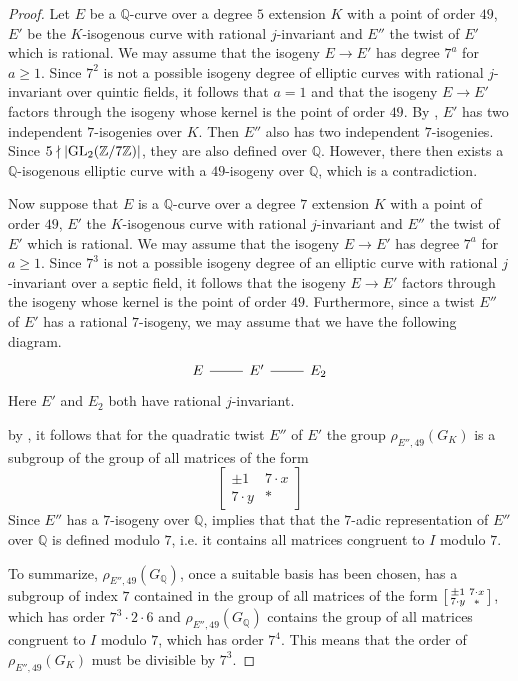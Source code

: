 \documentclass[10pt,leqno]{amsart}
\newcommand\m[1]{\begin{bmatrix}#1\end{bmatrix}}
\newcommand\sm[1]{\begin{bsmallmatrix}#1\end{bsmallmatrix}}
\newcommand{\Z}{\mathbb{Z}}
\newcommand{\Q}{\mathbb{Q}}
\newcommand{\GL}{\textnormal{GL}}
\theoremstyle{definition}
\theoremstyle{remark}
\numberwithin{theorem}{section}
\begin{document}
\begin{proof}
    Let $E$ be a $\Q$-curve over a degree $5$ extension $K$ with a point of order $49$, $E'$ be the $K$-isogenous curve with rational $j$-invariant and $E''$ the twist of $E'$ which is rational. We may assume that the isogeny $E \to E'$ has degree $7^a$ for $a\geq 1$. Since $7^2$ is not a possible isogeny degree of elliptic curves with rational $j$-invariant over quintic fields, it follows that $a=1$ and that the isogeny $E \to E'$ factors through the isogeny whose kernel is the point of order $49$.  By , $E'$ has two independent $7$-isogenies over $K$. Then $E''$ also has two independent $7$-isogenies. Since $5 \nmid |\GL_2(\Z/7\Z)|$, they are also defined over $\Q$. However, there then exists a $\Q$-isogenous elliptic curve with a $49$-isogeny over $\Q$, which is a contradiction. 

    Now suppose that $E$ is a $\Q$-curve over a degree $7$ extension $K$ with a point of order $49$, $E'$ the $K$-isogenous curve with rational $j$-invariant and $E''$ the twist of $E'$ which is rational. We may assume that the isogeny $E \to E'$ has degree $7^a$ for $a\geq 1$. Since $7^3$ is not a possible isogeny degree of an elliptic curve with rational $j$-invariant over a septic field, it follows that the isogeny $E \to E'$ factors through the isogeny whose kernel is the point of order $49$. Furthermore, since a twist $E''$ of $E'$ has a rational $7$-isogeny, we may assume that we have the following diagram. 
    \[\begin{tikzcd}
	E & {E'} & {E_2}
	\arrow[no head, from=1-1, to=1-2]
	\arrow[no head, from=1-2, to=1-3]
\end{tikzcd}\]
Here $E'$ and $E_2$ both have rational $j$-invariant. 
    
    by , it follows that for the quadratic twist $E''$ of $E'$ the group $\rho_{E'', 49}(G_K)$ is a subgroup of the group of all matrices of the form $$\m{\pm 1 & 7 \cdot x \\
    7\cdot y & *}$$ Since $E''$ has a $7$-isogeny over $\Q$, \cite[Theorem 3.9]{lombardo} implies that that the $7$-adic representation of $E''$ over $\Q$ is defined modulo $7$, i.e. it contains all matrices congruent to $I$ modulo $7$.

    To summarize, $\rho_{E'', 49}(G_\Q)$, once a suitable basis has been chosen, has a subgroup of index $7$ contained in the group of all matrices of the form $\sm{\pm 1 & 7 \cdot x \\
    7\cdot y & *}$, which has order $7^3\cdot 2\cdot 6$ and $\rho_{E'', 49}(G_\Q)$ contains the group of all matrices congruent to $I$ modulo $7$, which has order $7^4$. This means that the order of  $\rho_{E'', 49}(G_K)$ must be divisible by $7^3$. 
    

\end{proof}
\end{document}
